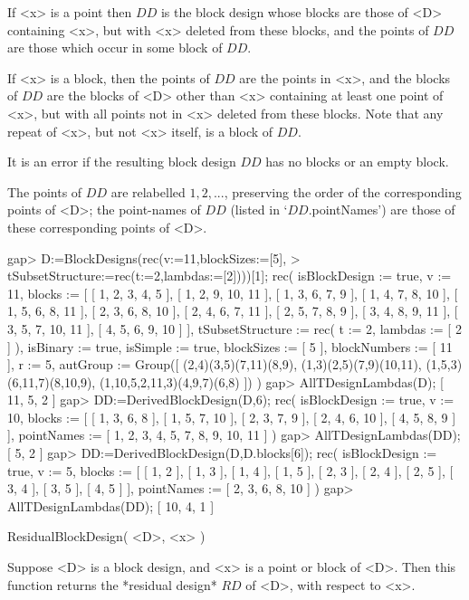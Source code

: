 If <x> is a point then $DD$ is the block design whose blocks are those
of <D> containing <x>, but with <x> deleted from these blocks, and the
points of $DD$ are those which occur in some block of $DD$.

If <x> is a block, then the points of $DD$ are the points in <x>, and
the blocks of $DD$ are the blocks of <D> other than <x> containing at
least one point of <x>, but with all points not in <x> deleted from
these blocks.  Note that any repeat of <x>, but not <x> itself, is a
block of $DD$.

It is an error if the resulting block design $DD$ has no blocks or an
empty block.

The points of $DD$ are relabelled $1,2,...$, preserving the order of
the corresponding points of <D>; the point-names of $DD$ (listed in
`$DD$.pointNames') are those of these corresponding points of <D>.

\beginexample
gap> D:=BlockDesigns(rec(v:=11,blockSizes:=[5],
>       tSubsetStructure:=rec(t:=2,lambdas:=[2])))[1];
rec( isBlockDesign := true, v := 11, 
  blocks := [ [ 1, 2, 3, 4, 5 ], [ 1, 2, 9, 10, 11 ], [ 1, 3, 6, 7, 9 ], 
      [ 1, 4, 7, 8, 10 ], [ 1, 5, 6, 8, 11 ], [ 2, 3, 6, 8, 10 ], 
      [ 2, 4, 6, 7, 11 ], [ 2, 5, 7, 8, 9 ], [ 3, 4, 8, 9, 11 ], 
      [ 3, 5, 7, 10, 11 ], [ 4, 5, 6, 9, 10 ] ], 
  tSubsetStructure := rec( t := 2, lambdas := [ 2 ] ), isBinary := true, 
  isSimple := true, blockSizes := [ 5 ], blockNumbers := [ 11 ], r := 5, 
  autGroup := Group([ (2,4)(3,5)(7,11)(8,9), (1,3)(2,5)(7,9)(10,11), 
      (1,5,3)(6,11,7)(8,10,9), (1,10,5,2,11,3)(4,9,7)(6,8) ]) )
gap> AllTDesignLambdas(D);      
[ 11, 5, 2 ]
gap> DD:=DerivedBlockDesign(D,6);
rec( isBlockDesign := true, v := 10, 
  blocks := [ [ 1, 3, 6, 8 ], [ 1, 5, 7, 10 ], [ 2, 3, 7, 9 ], 
      [ 2, 4, 6, 10 ], [ 4, 5, 8, 9 ] ], 
  pointNames := [ 1, 2, 3, 4, 5, 7, 8, 9, 10, 11 ] )
gap> AllTDesignLambdas(DD);
[ 5, 2 ]
gap> DD:=DerivedBlockDesign(D,D.blocks[6]);
rec( isBlockDesign := true, v := 5, 
  blocks := [ [ 1, 2 ], [ 1, 3 ], [ 1, 4 ], [ 1, 5 ], [ 2, 3 ], [ 2, 4 ], 
      [ 2, 5 ], [ 3, 4 ], [ 3, 5 ], [ 4, 5 ] ], 
  pointNames := [ 2, 3, 6, 8, 10 ] )
gap> AllTDesignLambdas(DD);
[ 10, 4, 1 ]
\endexample 



\>ResidualBlockDesign( <D>, <x> )

Suppose <D> is a block design, and <x> is a point or block of <D>.
Then this function returns the *residual design*
$RD$ of <D>, with respect to <x>.

